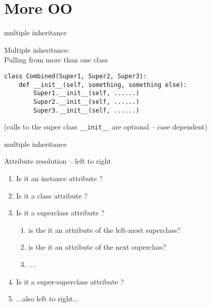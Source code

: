 \documentclass{beamer}
\begin{document}
\section{More OO}

\begin{frame}[fragile]{multiple inheritance}

{\Large Multiple inheritance:\\
\hspace{0.2in} Pulling from more than one class}

\vfill
\begin{verbatim}
class Combined(Super1, Super2, Super3):
    def __init__(self, something, something else):
        Super1.__init__(self, ......)        
        Super2.__init__(self, ......)        
        Super3.__init__(self, ......)        
\end{verbatim}
(calls to the super class \verb|__init__| are optional -- case dependent)

\end{frame} 

\begin{frame}[fragile]{multiple inheritance}

\vfill
{\Large Attribute resolution -- left to right}

\begin{enumerate}
  \item Is it an instance attribute ?
  \item Is it a class attribute ?
  \item Is it a superclass attribute ?
  \begin{enumerate}
     \item is the it an attribute of the left-most superclass?
     \item is the it an attribute of the next superclass?
     \item ....
  \end{enumerate}
  \item Is it a super-superclass attribute ?
  \item ...also left to right...
\end{enumerate}

\end{frame} 
\end{document}
